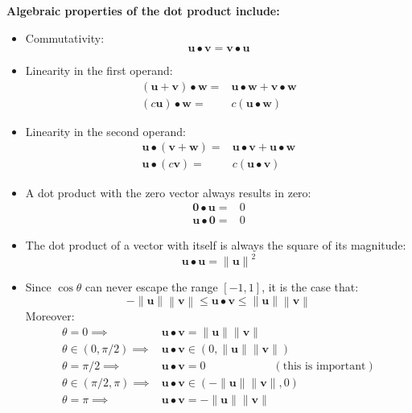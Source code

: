 \documentclass{article}
\begin{document}
\vspace{5mm}

\textbf{Algebraic properties of the dot product include:}

\begin{centering}
\begin{itemize}
\item Commutativity:
\[\mathbf{u} \bullet \mathbf{v} = \mathbf{v} \bullet \mathbf{u}\]
\item Linearity in the first operand:
\begin{align*}
(\mathbf{u} + \mathbf{v}) \bullet \mathbf{w} = & \mathbf{u} \bullet \mathbf{w} + \mathbf{v} \bullet \mathbf{w} \\ 
(c\mathbf{u}) \bullet \mathbf{w} = & c(\mathbf{u} \bullet \mathbf{w}) 
\end{align*}
\item Linearity in the second operand:
\begin{align*}
\mathbf{u} \bullet (\mathbf{v} + \mathbf{w}) = & \mathbf{u} \bullet \mathbf{v} + \mathbf{u} \bullet \mathbf{w} \\ 
\mathbf{u} \bullet (c\mathbf{v}) = & c(\mathbf{u} \bullet \mathbf{v}) 
\end{align*}
\item A dot product with the zero vector always results in zero:
\begin{align*}
\mathbf{0} \bullet \mathbf{u} = & 0 \\ 
\mathbf{u} \bullet \mathbf{0} = & 0
\end{align*}
\item The dot product of a vector with itself is always the square of its magnitude:
\[\mathbf{u} \bullet \mathbf{u} = \left\|\mathbf{u}\right\|^2\]
\item Since \(\cos\theta\) can never escape the range \([-1, 1]\), it is the case that:
\[- \left\|\mathbf{u}\right\| \left\|\mathbf{v}\right\| \leq \mathbf{u} \bullet \mathbf{v} \leq \left\|\mathbf{u}\right\| \left\|\mathbf{v}\right\|\]
Moreover:
\begin{align*}
\theta = 0 \implies & \mathbf{u} \bullet \mathbf{v} = \|\mathbf{u}\| \|\mathbf{v}\| \\
\theta \in (0, \pi/2) \implies & \mathbf{u} \bullet \mathbf{v} \in (0, \|\mathbf{u}\| \|\mathbf{v}\|) \\ 
\theta = \pi/2 \implies & \mathbf{u} \bullet \mathbf{v} = 0 \quad\quad\quad\quad\quad\quad (\text{this is important}) \\
\theta \in (\pi/2, \pi) \implies & \mathbf{u} \bullet \mathbf{v} \in (- \|\mathbf{u}\| \|\mathbf{v}\|, 0) \\ 
\theta = \pi \implies & \mathbf{u} \bullet \mathbf{v} = - \|\mathbf{u}\| \|\mathbf{v}\|
\end{align*}
\end{itemize}
\end{centering}
\end{document}
